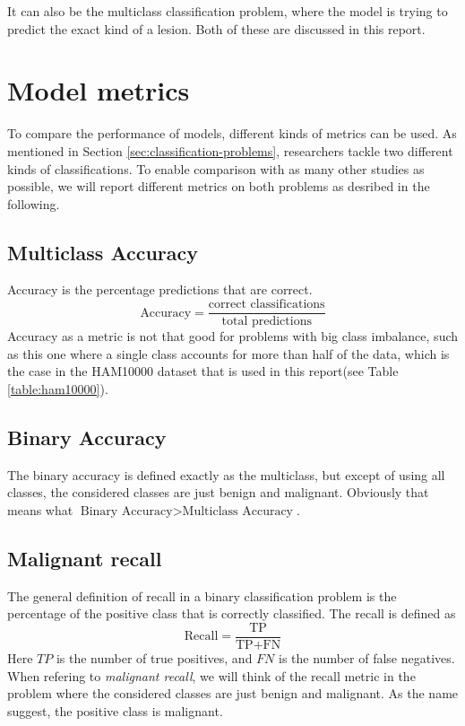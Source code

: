 It can also be the multiclass classification problem,
where the model is trying to predict the exact kind of a lesion.
Both of these are discussed in this report.

\section{Model metrics} \label{sec:model_metrics}
To compare the performance of models, different kinds of metrics can be used.
As mentioned in Section \ref{sec:classification-problems},
researchers tackle two different kinds of classifications.
To enable comparison with as many other studies as possible,
we will report different metrics
on both problems as desribed in the following.

\subsection{Multiclass Accuracy}
Accuracy is the percentage predictions that are correct.
\[
    \text{Accuracy} = \frac{\text{correct classifications}}{\text{total predictions}}
\]
Accuracy as a metric is not that good for problems with big class imbalance,
such as this one where a single class accounts for more than half of the data,
which is the case in the HAM10000 dataset that is used in this report(see Table \ref{table:ham10000}).

\subsection{Binary Accuracy}
The binary accuracy is defined exactly as the multiclass, but except of using all classes,
the considered classes are just benign and malignant.
Obviously that means what $\text{Binary Accuracy} > \text{Multiclass Accuracy}$.

\subsection{Malignant recall}
The general definition of recall in a binary classification problem is the percentage of the positive class
that is correctly classified.
The recall is defined as
\[
    \text{Recall} = \frac{\text{TP}}{\text{TP} + \text{FN}}
\]
Here $TP$ is the number of true positives, and $FN$ is the number of false negatives.
When refering to \textit{malignant recall}, we will think of the recall metric in the problem
where the considered classes are just benign and malignant.
As the name suggest, the positive class is malignant.

